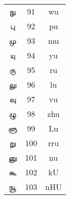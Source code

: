 \documentclass[a4paper,10pt]{article}
\begin{document}
\begin{table}[!t]
\begin{tabular}{ccc}
\t{ நு } & 91 & wu \\
\t{ பு } & 92 & pu \\
\t{ மு } & 93 & mu \\
\t{ யு } & 94 & yu \\
\t{ ரு } & 95 & ru \\
\t{ லு } & 96 & lu \\
\t{ வு } & 97 & vu \\
\t{ ழு } & 98 & zhu \\
\t{ ளு } & 99 & Lu \\
\t{ று } & 100 & rru \\
\t{ னு } & 101 & nu \\
\t{ கூ } & 102 & kU \\
\t{ ஙூ } & 103 & nHU \\
\bottomrule
\end{tabular}
\end{table}
\end{document}
